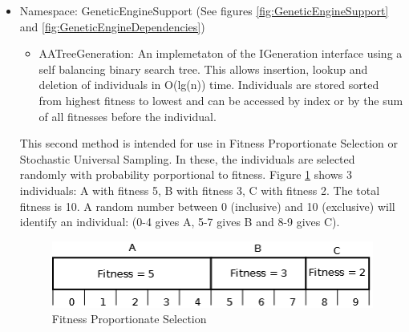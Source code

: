 \begin{itemize}
\item Namespace: GeneticEngineSupport (See figures \ref{fig:GeneticEngineSupport} and \ref{fig:GeneticEngineDependencies})
	\begin{itemize}
	\item AATreeGeneration: An implemetaton of the IGeneration interface using a self balancing binary search tree. This allows insertion, lookup and deletion of individuals in O(lg(n)) time. Individuals are stored sorted from highest fitness to lowest and can be accessed by index or by the sum of all fitnesses before the individual. 
	\end{itemize}
	
	This second method is intended for use in Fitness Proportionate Selection or Stochastic Universal Sampling. In these, the individuals are selected randomly with probability porportional to fitness. Figure \ref{fig:FitnessProportionateSelection} shows 3 individuals: A with fitness 5, B with fitness 3, C with fitness 2. The total fitness is 10. A random number between 0 (inclusive) and 10 (exclusive) will identify an individual: (0-4 gives A, 5-7 gives B and 8-9 gives C).
	
	\begin{figure}[ht!]
	 \caption{Fitness Proportionate Selection}\label{fig:FitnessProportionateSelection}
	 \centering
	 \includegraphics[scale=0.5]{../Stochastic.png}
	\end{figure}
	

\end{itemize}
